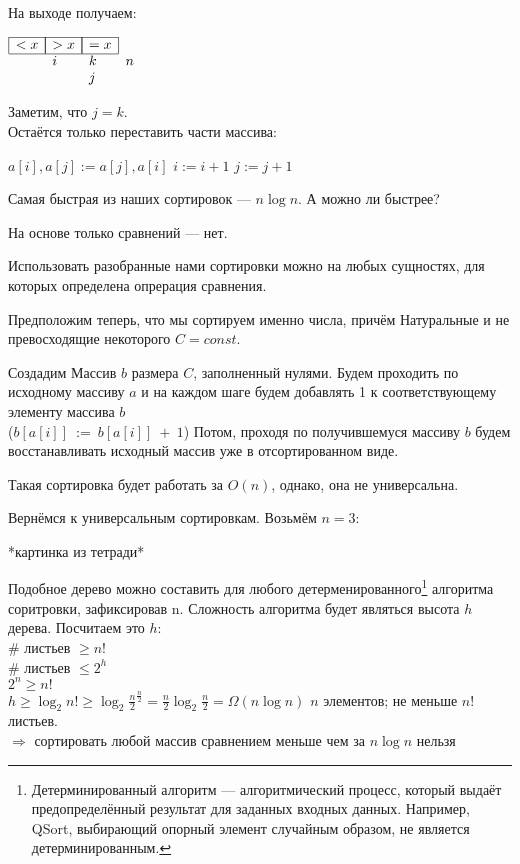 \documentclass[12pt,a4paper]{article}
\begin{document}
На выходе получаем:

$\begin{array}{llll}
    \cline{1-3}
    \multicolumn{1}{|c|}{<x} & \multicolumn{1}{|c|}{>x} & \multicolumn{1}{|c|}{=x}\\
    \cline{1-3}
    & i & k & n\\
    & & j\\
\end{array}$

Заметим, что $j = k$.\\

Остаётся только переставить части массива:

\begin{algorithm}
\begin{algorithmic}[1]
	\State $a[i], a[j] \mathrel{:=} a[j], a[i]$
	\State $i \mathrel{:=} i + 1$
	\State $j \mathrel{:=} j + 1$
\EndWhile
\end{algorithmic}
\end{algorithm}

Самая быстрая из наших сортировок --- $n \log n$. А можно ли быстрее?

На основе только сравнений --- нет. 

Использовать разобранные нами сортировки можно на любых сущностях, для которых определена опрерация сравнения.

Предположим теперь, что мы сортируем именно числа, причём Натуральные и не превосходящие некоторого $C = const$.

Создадим Массив $b$ размера $C$, заполненный нулями. Будем проходить по исходному массиву $a$ и на каждом шаге будем добавлять 1 к соответствующему элементу массива $b$\\ ($b[a[i]]~\mathrel{:=}~b[a[i]]~+~1$)
Потом, проходя по получившемуся массиву $b$ будем восстанавливать исходный массив уже в отсортированном виде.

Такая сортировка будет работать за $O(n)$, однако, она не универсальна.

Вернёмся к универсальным сортировкам. Возьмём $n = 3$:

*картинка из тетради*

Подобное дерево можно составить для любого детерменированного\footnote{Детерминированный алгоритм — алгоритмический процесс, который выдаёт предопределённый результат для заданных входных данных. Например, QSort, выбирающий опорный элемент случайным образом, не является детерминированным.} алгоритма соритровки, зафиксировав n. Сложность алгоритма будет являться высота $h$ дерева. Посчитаем это $h$:\\
\# листьев $\geqslant n!$\\
 \# листьев $\leqslant 2^h$\\
$2^n \geqslant n!$\\
$h \geqslant \log_2 n! \geqslant \log_2 \frac{n}{2}^{\frac{n}{2}} = \frac{n}{2}\log_2{\frac{n}{2}} = \Omega(n\log n)$
$n$ элементов; не меньше $n!$ листьев.\\
$\Rightarrow$ сортировать любой массив сравнением меньше чем за $n\log n$ нельзя
\end{document}
